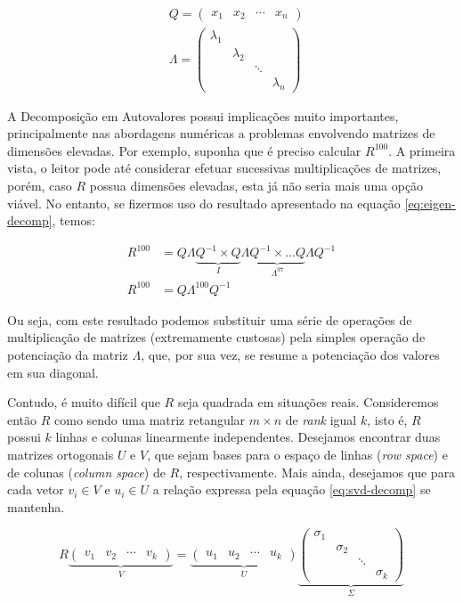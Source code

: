 \begin{align*}
&Q = \begin{pmatrix} x_1 & x_2 & \cdots & x_n \end{pmatrix} \\
&\Lambda =
 \begin{pmatrix}
  \lambda_1 &          &        & \\
           & \lambda_2 &        & \\
           &          & \ddots & \\
           &          &        & \lambda_n
 \end{pmatrix}
\end{align*}

A Decomposição em Autovalores possui implicações muito importantes, principalmente nas abordagens numéricas a problemas envolvendo matrizes de dimensões elevadas. Por exemplo, suponha que é preciso calcular $R^{100}$. A primeira vista, o leitor pode até considerar efetuar sucessivas multiplicações de matrizes, porém, caso $R$ possua dimensões elevadas, esta já não seria mais uma opção viável. No entanto, se fizermos uso do resultado apresentado na equação \ref{eq:eigen-decomp}, temos:

\begin{align*}
R^{100} &= Q \Lambda \underbrace{Q^{-1} \times Q}_{I} \Lambda \underbrace{Q^{-1} \times \ldots Q}_{\Lambda^{97}} \Lambda Q^{-1} \\
R^{100} &= Q \Lambda^{100} Q^{-1}
\end{align*}

Ou seja, com este resultado podemos substituir uma série de operações de multiplicação de matrizes (extremamente custosas) pela simples operação de potenciação da matriz $\Lambda$, que, por sua vez, se resume a potenciação dos valores em sua diagonal.

Contudo, é muito difícil que $R$ seja quadrada em situações reais. Consideremos então $R$ como sendo uma matriz retangular $m \times n$ de \textit{rank} igual $k$, isto é, $R$ possui $k$ linhas e colunas linearmente independentes. Desejamos encontrar duas matrizes ortogonais $U$ e $V$, que sejam bases para o espaço de linhas (\textit{row space}) e de colunas (\textit{column space}) de $R$, respectivamente. Mais ainda, desejamos que para cada vetor $v_i \in V$ e $u_i \in U$ a relação expressa pela equação \ref{eq:svd-decomp} se mantenha.

\begin{equation}
R \underbrace{\begin{pmatrix} v_1 & v_2 & \cdots & v_k \end{pmatrix}}_{V} = \underbrace{\begin{pmatrix} u_1 & u_2 & \cdots & u_k \end{pmatrix}}_{U} \underbrace{\begin{pmatrix}
  \sigma_1 &          &        & \\
           & \sigma_2 &        & \\
           &          & \ddots & \\
           &          &        & \sigma_k
 \end{pmatrix}}_{\Sigma} 
\label{eq:svd-decomp}
\end{equation}


